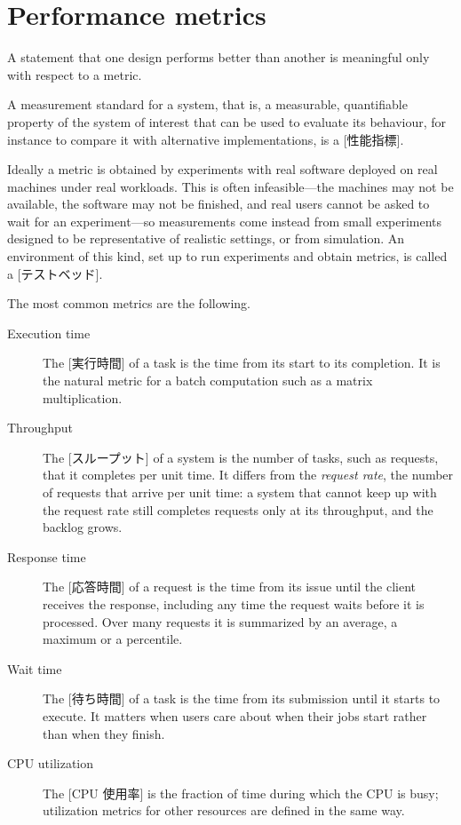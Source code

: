 \documentclass[../main.tex]{subfiles}
\begin{document}
\section{Performance metrics}
\label{sec:l06-metrics}

A statement that one design performs better than another is meaningful
only with respect to a metric.

\begin{definition}
  A measurement standard for a system, that is, a measurable, quantifiable
  property of the system of interest that can be used to evaluate its
  behaviour, for instance to compare it with alternative implementations,
  is a [性能指標].
\end{definition}

Ideally a metric is obtained by experiments with real software deployed on
real machines under real workloads.  This is often infeasible---the
machines may not be available, the software may not be finished, and real
users cannot be asked to wait for an experiment---so measurements come
instead from small experiments designed to be representative of realistic
settings, or from simulation.  An environment of this kind, set up to run
experiments and obtain metrics, is called a [テストベッド].

The most common metrics are the following.
\begin{description}
  \item[Execution time] The [実行時間] of a task is the
    time from its start to its completion.  It is the natural metric for a
    batch computation such as a matrix multiplication.
  \item[Throughput] The [スループット] of a system is the
    number of tasks, such as requests, that it completes per unit time.  It
    differs from the \emph{request rate}, the number of requests that
    arrive per unit time: a system that cannot keep up with the request rate
    still completes requests only at its throughput, and the backlog grows.
  \item[Response time] The [応答時間] of a request is
    the time from its issue until the client receives the response,
    including any time the request waits before it is processed.  Over many
    requests it is summarized by an average, a maximum or a percentile.
  \item[Wait time] The [待ち時間] of a task is the time from
    its submission until it starts to execute.  It matters when users care
    about when their jobs start rather than when they finish.
  \item[CPU utilization] The [CPU 使用率] is the
    fraction of time during which the CPU is busy; utilization
    metrics for other resources are defined in the same way.
\end{description}
\end{document}
